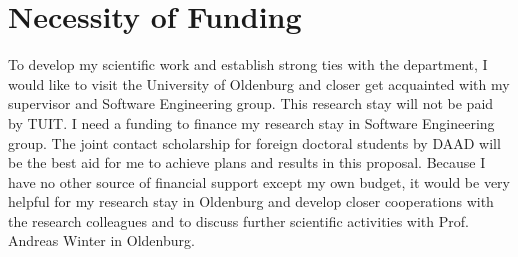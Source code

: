 \documentclass[10pt, oneside]{article}
\begin{document}
\section{Necessity of Funding}
To develop my scientific work and establish strong ties with the department, I would like to visit the University of Oldenburg and closer get acquainted with my supervisor and Software Engineering group. This research stay will not be paid by TUIT. I need a funding to finance my research stay in Software Engineering group. The joint contact scholarship for foreign doctoral students by DAAD will be the best aid for me to achieve plans and results in this proposal. Because I have no other source of financial support except my own budget, it would be very helpful for my research stay in Oldenburg and develop closer cooperations with the research colleagues and to discuss further scientific activities with Prof. Andreas Winter in Oldenburg.
\end{document}
